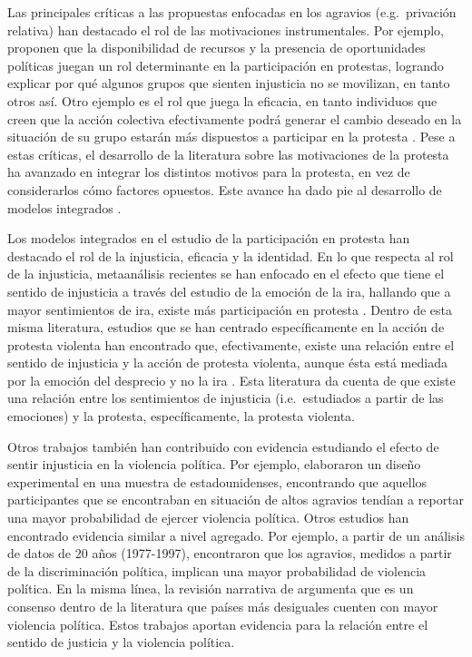 \documentclass[12pt,twoside]{templates/facsothesis}
\begin{document}
Las principales críticas a las propuestas enfocadas en los agravios (e.g.~privación relativa) han destacado el rol de las motivaciones instrumentales. Por ejemplo, \citet{McCarthy2017} proponen que la disponibilidad de recursos y la presencia de oportunidades políticas juegan un rol determinante en la participación en protestas, logrando explicar por qué algunos grupos que sienten injusticia no se movilizan, en tanto otros así. Otro ejemplo es el rol que juega la eficacia, en tanto individuos que creen que la acción colectiva efectivamente podrá generar el cambio deseado en la situación de su grupo estarán más dispuestos a participar en la protesta \citep{Klandermans1997}. Pese a estas críticas, el desarrollo de la literatura sobre las motivaciones de la protesta ha avanzado en integrar los distintos motivos para la protesta, en vez de considerarlos cómo factores opuestos. Este avance ha dado pie al desarrollo de modelos integrados \citep[e.g.][]{Gamson1992, Klandermans2008}.

Los modelos integrados en el estudio de la participación en protesta han destacado el rol de la injusticia, eficacia y la identidad. En lo que respecta al rol de la injusticia, metaanálisis recientes se han enfocado en el efecto que tiene el sentido de injusticia a través del estudio de la emoción de la ira, hallando que a mayor sentimientos de ira, existe más participación en protesta \citep{vanZomeren2008, Agostini2021}. Dentro de esta misma literatura, estudios que se han centrado específicamente en la acción de protesta violenta han encontrado que, efectivamente, existe una relación entre el sentido de injusticia y la acción de protesta violenta, aunque ésta está mediada por la emoción del desprecio y no la ira \citep{Tausch2011}. Esta literatura da cuenta de que existe una relación entre los sentimientos de injusticia (i.e.~estudiados a partir de las emociones) y la protesta, específicamente, la protesta violenta.

Otros trabajos también han contribuido con evidencia estudiando el efecto de sentir injusticia en la violencia política. Por ejemplo, \citet{Lemieux2012} elaboraron un diseño experimental en una muestra de estadounidenses, encontrando que aquellos participantes que se encontraban en situación de altos agravios tendían a reportar una mayor probabilidad de ejercer violencia política. Otros estudios han encontrado evidencia similar a nivel agregado. Por ejemplo, a partir de un análisis de datos de 20 años (1977-1997), \citet{Regan2005} encontraron que los agravios, medidos a partir de la discriminación política, implican una mayor probabilidad de violencia política. En la misma línea, la revisión narrativa de \citet{Ostby2013} argumenta que es un consenso dentro de la literatura que países más desiguales cuenten con mayor violencia política. Estos trabajos aportan evidencia para la relación entre el sentido de justicia y la violencia política.
\end{document}
